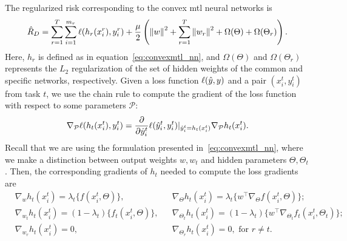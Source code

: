 %
The regularized risk corresponding to the convex \acrshort{mtl} neural networks is
\begin{equation}
    \nonumber
    \begin{aligned}
        \hat{R}_{D} = \sum_{r=1}^T \sum_{i=1}^{m_r} \ell(h_r(x_i^r), y_i^r) + \frac{\mu}{2} \left( \left\lVert w\right\rVert^2 + \sum_{r=1}^T \left\lVert w_r\right\rVert^2 + \Omega(\Theta) + \Omega(\Theta_r)\right) .
    \end{aligned}
\end{equation}
Here, $h_r$ is defined as in equation~\eqref{eq:convexmtl_nn}, and $\Omega(\Theta)$ and $\Omega(\Theta_r)$ represents the $L_2$ regularization of the set of hidden weights of the common and specific networks, respectively.
Given a loss function $\ell(\hat{y}, y)$ and a pair $(x_i^t, y_i^t)$ from task $t$, we use the chain rule to compute the gradient of the loss function with respect to some parameters $\mathcal{P}$:
\begin{equation}
    \nonumber
    \nabla_\mathcal{P} \ell(h_t(x_i^t), y_i^t) = 
    \frac{\partial}{\partial \hat{y}_i^t} \ell(\hat{y}_i^t, y_i^t) \vert_{\hat{y}_i^t = h_t(x_i^t)} \nabla_\mathcal{P} h_t(x_i^t) .
\end{equation}
Recall that we are using the formulation presented in~\eqref{eq:convexmtl_nn},
where we make a distinction between output weights $w, w_t$ and hidden parameters $\Theta, \Theta_t$.
Then, the corresponding gradients of $h_t$ needed to compute the loss gradients are
\begin{equation}\label{eq:gradients_losses} 
    \begin{aligned}       
        &\nabla_{w} h_t(x_i^t)  
        = \lambda_t \lbrace f(x_i^t, \Theta) \rbrace ,
        &&\nabla_{\Theta} h_t(x_i^t)  
        = \lambda_t \lbrace w^\intercal \nabla_\Theta f(x_i^t, \Theta)\rbrace ; \\
        &\nabla_{w_t} h_t(x_i^t)  
        = (1 - \lambda_t) \lbrace f_t(x_i^t, \Theta) \rbrace ,
        &&\nabla_{\Theta_t} h_t(x_i^t)  
        = (1 - \lambda_t) \lbrace  w^\intercal \nabla_{\Theta_t} f_t(x_i^t, \Theta_t)\rbrace ; \\
        &\nabla_{w_r} h_t(x_i^t)  
        =  0 , 
        &&\nabla_{\Theta_r} h_t(x_i^t)  
        =  0 , \text{ for } r \neq t .\\
    \end{aligned}    
\end{equation}
